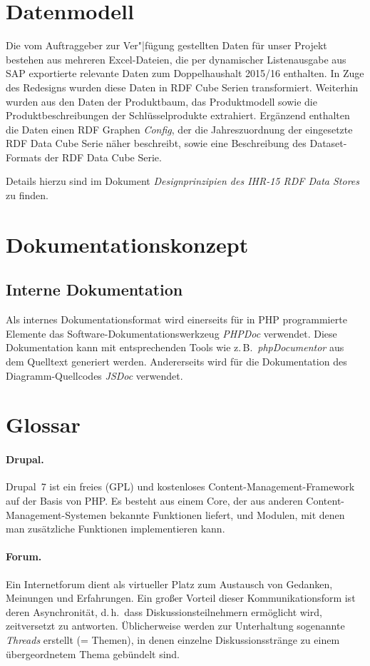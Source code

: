 \documentclass[a4paper,11pt,twoside]{article}
\begin{document}
\section{Datenmodell}

Die vom Auftraggeber zur Ver"|fügung gestellten Daten für unser Projekt
bestehen aus mehreren Excel-Dateien, die per dynamischer Listenausgabe aus SAP
exportierte relevante Daten zum Doppelhaushalt 2015/16 enthalten.  In Zuge des
Redesigns wurden diese Daten in RDF Cube Serien transformiert.  Weiterhin
wurden aus den Daten der Produktbaum, das Produktmodell sowie die
Produktbeschreibungen der Schlüsselprodukte extrahiert.  Ergänzend enthalten
die Daten einen RDF Graphen \emph{Config}, der die Jahreszuordnung der
eingesetzte RDF Data Cube Serie näher beschreibt, sowie eine Beschreibung des
Dataset-Formats der RDF Data Cube Serie. 

Details hierzu sind im Dokument \emph{Designprinzipien des IHR-15 RDF Data
  Stores} zu finden. 

\section{Dokumentationskonzept}

\subsection{Interne Dokumentation}
Als internes Dokumentationsformat wird einerseits für in PHP programmierte
Elemente das Software-Dokumentationswerkzeug \emph{PHPDoc} verwendet. Diese
Dokumentation kann mit entsprechenden Tools wie z.\,B.\ \emph{phpDocumentor}
aus dem Quelltext generiert werden. Andererseits wird für die Dokumentation
des Diagramm-Quellcodes \emph{JSDoc} verwendet.

\section{Glossar}

\paragraph{Drupal.} 
Drupal~7 ist ein freies (GPL) und kostenloses Content-Management-Framework auf
der Basis von PHP. Es besteht aus einem Core, der aus anderen
Content-Management-Systemen bekannte Funktionen liefert, und Modulen, mit
denen man zusätzliche Funktionen implementieren kann.

\paragraph{Forum.} 
Ein Internetforum dient als virtueller Platz zum Austausch von Gedanken,
Meinungen und Erfahrungen. Ein großer Vorteil dieser Kommunikationsform ist
deren Asynchronität, d.\,h.\ dass Diskussionsteilnehmern ermöglicht wird,
zeitversetzt zu antworten. Üblicherweise werden zur Unterhaltung sogenannte
\textit{Threads} erstellt (= Themen), in denen einzelne Diskussionsstränge zu
einem übergeordnetem Thema gebündelt sind.
\end{document}
